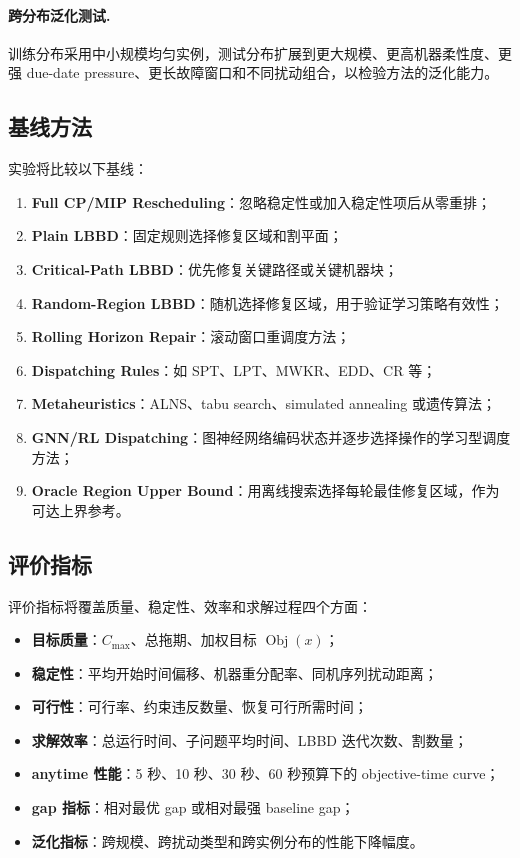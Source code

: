 \documentclass[UTF8,12pt,a4paper]{ctexart}
\newcommand{\obj}{\operatorname{Obj}}
\begin{document}
\paragraph{跨分布泛化测试.} 训练分布采用中小规模均匀实例，测试分布扩展到更大规模、更高机器柔性度、更强 due-date pressure、更长故障窗口和不同扰动组合，以检验方法的泛化能力。

\subsection{基线方法}

实验将比较以下基线：

\begin{enumerate}
    \item \textbf{Full CP/MIP Rescheduling}：忽略稳定性或加入稳定性项后从零重排；
    \item \textbf{Plain LBBD}：固定规则选择修复区域和割平面；
    \item \textbf{Critical-Path LBBD}：优先修复关键路径或关键机器块；
    \item \textbf{Random-Region LBBD}：随机选择修复区域，用于验证学习策略有效性；
    \item \textbf{Rolling Horizon Repair}：滚动窗口重调度方法；
    \item \textbf{Dispatching Rules}：如 SPT、LPT、MWKR、EDD、CR 等；
    \item \textbf{Metaheuristics}：ALNS、tabu search、simulated annealing 或遗传算法；
    \item \textbf{GNN/RL Dispatching}：图神经网络编码状态并逐步选择操作的学习型调度方法；
    \item \textbf{Oracle Region Upper Bound}：用离线搜索选择每轮最佳修复区域，作为可达上界参考。
\end{enumerate}

\subsection{评价指标}

评价指标将覆盖质量、稳定性、效率和求解过程四个方面：
\begin{itemize}
    \item \textbf{目标质量}：$C_{\max}$、总拖期、加权目标 $\obj(x)$；
    \item \textbf{稳定性}：平均开始时间偏移、机器重分配率、同机序列扰动距离；
    \item \textbf{可行性}：可行率、约束违反数量、恢复可行所需时间；
    \item \textbf{求解效率}：总运行时间、子问题平均时间、LBBD 迭代次数、割数量；
    \item \textbf{anytime 性能}：5 秒、10 秒、30 秒、60 秒预算下的 objective-time curve；
    \item \textbf{gap 指标}：相对最优 gap 或相对最强 baseline gap；
    \item \textbf{泛化指标}：跨规模、跨扰动类型和跨实例分布的性能下降幅度。
\end{itemize}
\end{document}
